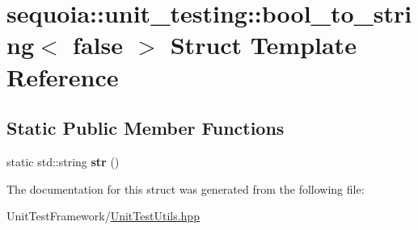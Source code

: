 \hypertarget{structsequoia_1_1unit__testing_1_1bool__to__string_3_01false_01_4}{}\section{sequoia\+::unit\+\_\+testing\+::bool\+\_\+to\+\_\+string$<$ false $>$ Struct Template Reference}
\label{structsequoia_1_1unit__testing_1_1bool__to__string_3_01false_01_4}
\subsection*{Static Public Member Functions}
\begin{DoxyCompactItemize}
\item 
\mbox{\label{structsequoia_1_1unit__testing_1_1bool__to__string_3_01false_01_4_a372d649e4d5ae09fea2a52ff6f2d569d}} 
static std\+::string {\bfseries str} ()
\end{DoxyCompactItemize}


The documentation for this struct was generated from the following file\+:\begin{DoxyCompactItemize}
\item 
Unit\+Test\+Framework/\mbox{\hyperlink{_unit_test_utils_8hpp}{Unit\+Test\+Utils.\+hpp}}\end{DoxyCompactItemize}
